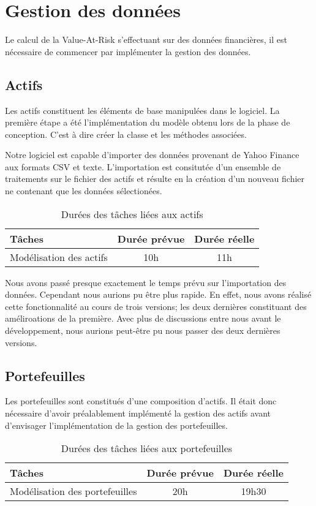\documentclass[a4paper]{report}
\begin{document}
\section{Gestion des données}
Le calcul de la Value-At-Risk s'effectuant sur des données financières, il est nécessaire de commencer par implémenter la gestion des données.

\subsection{Actifs}
Les actifs constituent les éléments de base manipulées dans le logiciel.
La première étape a été l'implémentation du modèle obtenu lors de la phase de conception.
C'est à dire créer la classe et les méthodes associées.

Notre logiciel est capable d'importer des données provenant de Yahoo Finance aux formats CSV et texte.
L'importation est consitutée d'un ensemble de traitements sur le fichier des actifs et résulte en la création d'un nouveau fichier ne contenant que les données sélectionées.

\begin{table}[H]
\centering
  \begin{tabularx}{0.8\textwidth}{| X | c | c |}
    \hline
	Tâches & Durée prévue & Durée réelle\\
    \hline
    Modélisation des actifs & 10h & 11h\\
    \hline
  \end{tabularx}
  \caption{Durées des tâches liées aux actifs}
\end{table}

Nous avons passé presque exactement le temps prévu sur l'importation des données.
Cependant nous aurions pu être plus rapide.
En effet, nous avons réalisé cette fonctionnalité au cours de trois versions; les deux dernières constituant des améliroations de la première.
Avec plus de discussions entre nous avant le développement, nous aurions peut-être pu nous passer des deux dernières versions.

\subsection{Portefeuilles}
Les portefeuilles sont constitués d'une composition d'actifs.
Il était donc nécessaire d'avoir préalablement implémenté la gestion des actifs avant d'envisager l'implémentation de la gestion des portefeuilles.

\begin{table}[H]
\centering
  \begin{tabularx}{0.8\textwidth}{| X | c | c |}
    \hline
	Tâches & Durée prévue & Durée réelle \\
    \hline
     Modélisation des portefeuilles &  20h & 19h30\\
    \hline
  \end{tabularx}
  \caption{Durées des tâches liées aux portefeuilles}
\end{table}
\end{document}
